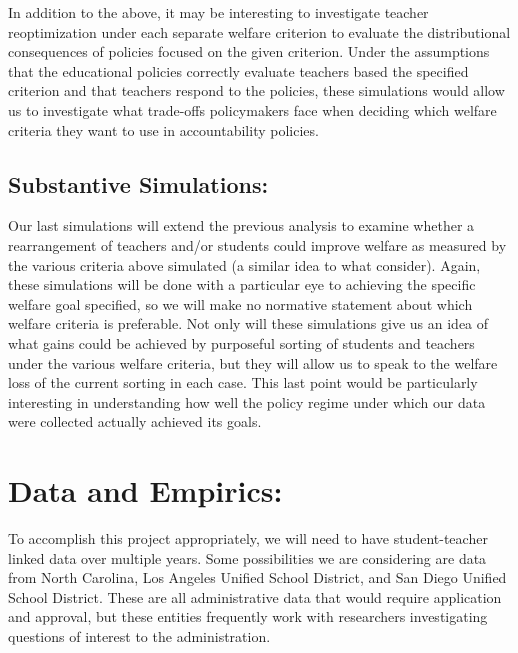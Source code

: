 \documentclass[letterpaper,12pt]{article}
\begin{document}
In addition to the above, it may be interesting to investigate teacher reoptimization under each separate welfare criterion to evaluate the distributional consequences of policies focused on the given criterion. Under the assumptions that the educational policies correctly evaluate teachers based the specified criterion and that teachers respond to the policies, these simulations would allow us to investigate what trade-offs policymakers face when deciding which welfare criteria they want to use in accountability policies.


\subsection{Substantive Simulations:}

Our last simulations will extend the previous analysis to examine whether a rearrangement of teachers and/or students could improve welfare as measured by the various criteria above simulated (a similar idea to what \citet{condie2014teacher} consider). Again, these simulations will be done with a particular eye to achieving the specific welfare goal specified, so we will make no normative statement about which welfare criteria is preferable. Not only will these simulations give us an idea of what gains could be achieved by purposeful sorting of students and teachers under the various welfare criteria, but they will allow us to speak to the welfare loss of the current sorting in each case. This last point would be particularly interesting in understanding how well the policy regime under which our data were collected actually achieved its goals. 




\section{Data and Empirics:}

To accomplish this project appropriately, we will need to have student-teacher linked data over multiple years. Some possibilities we are considering are data from North Carolina, Los Angeles Unified School District, and San Diego Unified School District. These are all administrative data that would require application and approval, but these entities frequently work with researchers investigating questions of interest to the administration.
\end{document}
